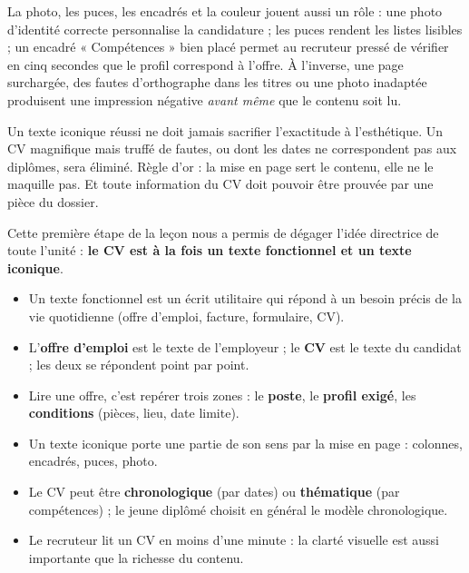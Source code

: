 \documentclass[11pt]{article}
\newcommand{\cle}[1]{{\popxbold\color{popdark}#1}}
\newcounter{popsec}
\newcounter{popsub}
\newcommand{\courssub}[1]{%
  \stepcounter{popsub}%
  \par\vspace{9pt}\noindent{\popxbold\fontsize{11.5}{13}\selectfont\color{popink}{\color{poporange}\thepopsec.\thepopsub}\hspace{6pt}#1}\par\nopagebreak\vspace{4pt}
}
\begin{document}
La photo, les puces, les encadrés et la couleur jouent aussi un rôle : une photo d'identité correcte personnalise la candidature ; les puces rendent les listes lisibles ; un encadré « Compétences » bien placé permet au recruteur pressé de vérifier en cinq secondes que le profil correspond à l'offre. À l'inverse, une page surchargée, des fautes d'orthographe dans les titres ou une photo inadaptée produisent une impression négative \emph{avant même} que le contenu soit lu.

\begin{attention}
Un texte iconique réussi ne doit jamais sacrifier l'exactitude à l'esthétique. Un CV magnifique mais truffé de fautes, ou dont les dates ne correspondent pas aux diplômes, sera éliminé. Règle d'or : la mise en page sert le contenu, elle ne le maquille pas. Et toute information du CV doit pouvoir être prouvée par une pièce du dossier.
\end{attention}

\courssub{Bilan de la découverte}

Cette première étape de la leçon nous a permis de dégager l'idée directrice de toute l'unité : \textbf{le CV est à la fois un texte fonctionnel et un texte iconique}.

\begin{aretenir}
\begin{itemize}
\item Un \cle{texte fonctionnel} est un écrit utilitaire qui répond à un besoin précis de la vie quotidienne (offre d'emploi, facture, formulaire, CV).
\item L'\textbf{offre d'emploi} est le texte de l'employeur ; le \textbf{CV} est le texte du candidat ; les deux se répondent point par point.
\item Lire une offre, c'est repérer trois zones : le \textbf{poste}, le \textbf{profil exigé}, les \textbf{conditions} (pièces, lieu, date limite).
\item Un \cle{texte iconique} porte une partie de son sens par la mise en page : colonnes, encadrés, puces, photo.
\item Le CV peut être \textbf{chronologique} (par dates) ou \textbf{thématique} (par compétences) ; le jeune diplômé choisit en général le modèle chronologique.
\item Le recruteur lit un CV en moins d'une minute : la clarté visuelle est aussi importante que la richesse du contenu.
\end{itemize}
\end{aretenir}
\end{document}
